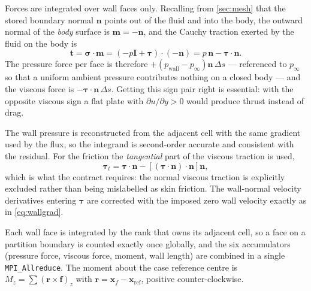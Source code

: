 Forces are integrated over wall faces only. Recalling from \cref{sec:mesh} that
the stored boundary normal $\mathbf{n}$ points out of the fluid and into the
body, the outward normal of the \emph{body} surface is $\mathbf{m}=-\mathbf{n}$,
and the Cauchy traction exerted by the fluid on the body is
\begin{equation}
  \mathbf{t}=\boldsymbol{\sigma}\!\cdot\!\mathbf{m}
  =\left(-p\mathbf{I}+\boldsymbol{\tau}\right)\!\cdot\!(-\mathbf{n})
  =p\,\mathbf{n}-\boldsymbol{\tau}\!\cdot\!\mathbf{n}.
  \label{eq:traction}
\end{equation}
The pressure force per face is therefore $+(p_{\mathrm{wall}}-p_\infty)\mathbf{n}\,\Delta s$
--- referenced to $p_\infty$ so that a uniform ambient pressure contributes
nothing on a closed body --- and the viscous force is $-\boldsymbol{\tau}\!\cdot\!\mathbf{n}\,\Delta s$.
Getting this sign pair right is essential: with the opposite viscous sign a flat
plate with $\partial u/\partial y>0$ would produce thrust instead of drag.

The wall pressure is reconstructed from the adjacent cell with the same gradient
used by the flux, so the integrand is second-order accurate and consistent with
the residual. For the friction the \emph{tangential} part of the viscous
traction is used,
\begin{equation}
  \boldsymbol{\tau}_t=\boldsymbol{\tau}\!\cdot\!\mathbf{n}
  -\left[(\boldsymbol{\tau}\!\cdot\!\mathbf{n})\!\cdot\!\mathbf{n}\right]\mathbf{n},
  \label{eq:shear}
\end{equation}
which is what the contract requires: the normal viscous traction is explicitly
excluded rather than being mislabelled as skin friction. The wall-normal velocity
derivatives entering $\boldsymbol{\tau}$ are corrected with the imposed zero wall
velocity exactly as in \cref{eq:wallgrad}.

Each wall face is integrated by the rank that owns its adjacent cell, so a face on
a partition boundary is counted exactly once globally, and the six accumulators
(pressure force, viscous force, moment, wall length) are combined in a single
\texttt{MPI\_Allreduce}. The moment about the case reference centre is
$M_z=\sum (\mathbf{r}\times\mathbf{f})_z$ with
$\mathbf{r}=\mathbf{x}_f-\mathbf{x}_{\mathrm{ref}}$, positive counter-clockwise.
